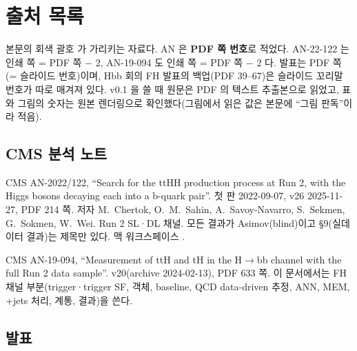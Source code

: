 \chapter{출처 목록}\label{ch:sources}

본문의 회색 괄호  가 가리키는 자료다. AN 은 \textbf{PDF 쪽 번호}로 적었다. AN-22-122 는 인쇄 쪽 = PDF 쪽 $-$ 2, AN-19-094 도
인쇄 쪽 = PDF 쪽 $-$ 2 다. 발표는 PDF 쪽(= 슬라이드 번호)이며, Hbb 회의 FH 발표의 백업(PDF 39–67)은 슬라이드 꼬리말 번호가 따로 매겨져 있다.
v0.1 을 쓸 때 원문은 PDF 의 텍스트 추출본으로 읽었고, 표와 그림의 숫자는 원본 렌더링으로 확인했다(그림에서 읽은 값은 본문에 ``그림 판독''이라 적음).

\section{CMS 분석 노트}\label{sec:sources-an}

\begin{description}[style=nextline,leftmargin=0pt]
\item[AN-22-122 v26] CMS AN-2022/122, ``Search for the ttHH production process at Run 2, with the Higgs bosons decaying each into a b-quark pair''.
첫 판 2022-09-07, v26 2025-11-27, PDF 214 쪽. 저자 M.~Chertok, O.~M.~Sahin, A.~Savoy-Navarro, S.~Sekmen, G.~Sokmen, W.~Wei.
Run 2 SL·DL 채널. 모든 결과가 Asimov(blind)이고 §9(실데이터 결과)는 제목만 있다. 맥 워크스페이스 .
\item[AN-19-094 v20] CMS AN-19-094, ``Measurement of ttH and tH in the H$\to$bb channel with the full Run 2 data sample''. v20(archive 2024-02-13),
PDF 633 쪽. 이 문서에서는 FH 채널 부분(trigger·trigger SF, 객체, baseline, QCD data-driven 추정, ANN, MEM, \ttbar{}+jets 처리, 계통, 결과)을 쓴다.
\end{description}

\section{발표}\label{sec:sources-talks}

